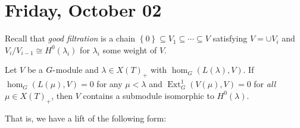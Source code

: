\hypertarget{friday-october-02}{%
\section{Friday, October 02}\label{friday-october-02}}

Recall that \emph{good filtration} is a chain
\(\left\{{0}\right\} \subseteq V_1 \subseteq \cdots \subseteq V\)
satisfying \(V = \cup V_i\) and \(V_i/V_{i-1} \cong H^0(\lambda_i)\) for
\(\lambda_i\) some weight of \(V\).

\begin{lemma}[?]

\begin{lemma}[?]

Let \(V\) be a \(G{\hbox{-}}\)module and \(\lambda \in X(T)_+\) with
\(\hom_G(L(\lambda), V)\). If \(\hom_G(L(\mu), V) = 0\) for any
\(\mu < \lambda\) and \(\operatorname{Ext}_G^1(V(\mu), V) = 0\) for
\emph{all} \(\mu \in X(T)_+\), then \(V\) contains a submodule
isomorphic to \(H^0(\lambda)\).

\end{lemma}

\end{lemma}

That is, we have a lift of the following form:

\begin{center}
\end{center}

